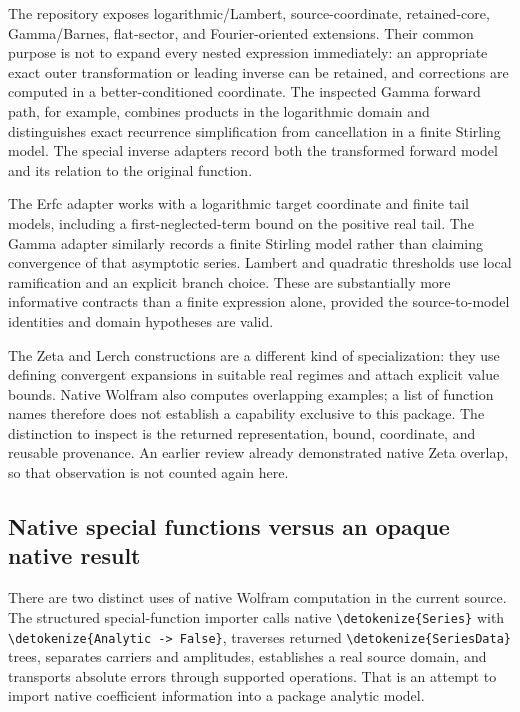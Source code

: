 \documentclass[11pt,a4paper]{article}
\newcommand{\wl}[1]{\texttt{\expandafter\nolinkurl\expandafter{\detokenize{#1}}}}
\begin{document}
The repository exposes logarithmic/Lambert, source-coordinate, retained-core,
Gamma/Barnes, flat-sector, and Fourier-oriented extensions. Their common purpose
is not to expand every nested expression immediately: an appropriate exact
outer transformation or leading inverse can be retained, and corrections are
computed in a better-conditioned coordinate. The inspected Gamma forward path,
for example, combines products in the logarithmic domain and distinguishes
exact recurrence simplification from cancellation in a finite Stirling model.
The special inverse adapters record both the transformed forward model and
its relation to the original function.\cite{readme,modulemap,gamma,special}

The Erfc adapter works with a logarithmic target coordinate and finite tail
models, including a first-neglected-term bound on the positive real tail. The
Gamma adapter similarly records a finite Stirling model rather than claiming
convergence of that asymptotic series. Lambert and quadratic thresholds use
local ramification and an explicit branch choice. These are substantially more
informative contracts than a finite expression alone, provided the source-to-model
identities and domain hypotheses are valid.\cite{special}

The Zeta and Lerch constructions are a different kind of specialization: they
use defining convergent expansions in suitable real regimes and attach explicit
value bounds. Native Wolfram also computes overlapping examples; a list of
function names therefore does not establish a capability exclusive to this
package. The distinction to inspect is the returned representation, bound,
coordinate, and reusable provenance. An earlier review already demonstrated
native Zeta overlap, so that observation is not counted again here.\cite{dirichlet,r17}

\subsection{Native special functions versus an opaque native result}

There are two distinct uses of native Wolfram computation in the current source.
The structured special-function importer calls native \wl{Series} with
\wl{Analytic -> False}, traverses returned \wl{SeriesData} trees, separates
carriers and amplitudes, establishes a real source domain, and transports
absolute errors through supported operations. That is an attempt to import
native coefficient information into a package analytic model.\cite{nativespecial}
\end{document}
